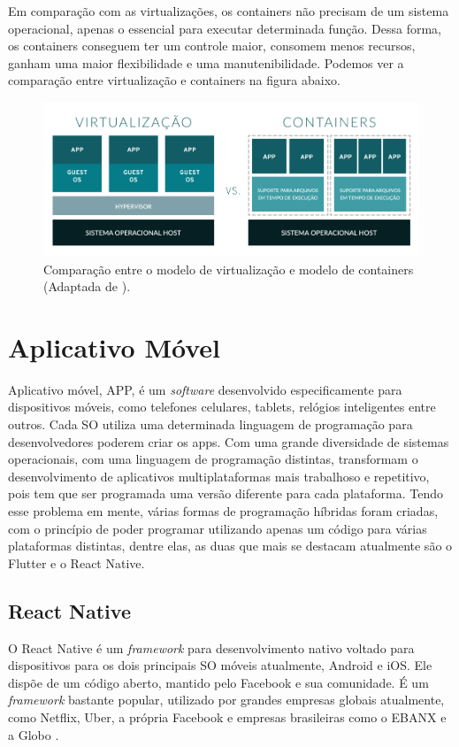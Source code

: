 Em comparação com as virtualizações, os containers não precisam de um sistema operacional, apenas o essencial para executar determinada função. Dessa forma, os containers conseguem ter um controle maior, consomem menos recursos, ganham uma maior flexibilidade e uma manutenibilidade. Podemos ver a comparação entre virtualização e containers na figura abaixo.

\begin{figure}[H]
  \centering
  \includegraphics[width=.80\textwidth]{assets/virtualization-vs-containers.png} 
  \caption{Comparação entre o modelo de virtualização e modelo de containers (Adaptada de \cite{redhat2020Containers}).}
  \label{fig:virtualization-vs-containers}
\end{figure}


\section{Aplicativo Móvel}
\label{fund:app}
Aplicativo móvel, APP, é um \textit{software} desenvolvido especificamente para dispositivos móveis, como telefones celulares, tablets, relógios inteligentes entre outros. Cada SO utiliza uma determinada linguagem de programação para desenvolvedores poderem criar os apps. Com uma grande diversidade de sistemas operacionais, com uma linguagem de programação distintas, transformam o desenvolvimento de aplicativos multiplataformas mais trabalhoso e repetitivo, pois tem que ser programada uma versão diferente para cada plataforma. Tendo esse problema em mente, várias formas de programação híbridas foram criadas, com o princípio de poder programar utilizando apenas um código para várias plataformas distintas, dentre elas, as duas que mais se destacam atualmente são o Flutter e o React Native.

\subsection{React Native}
\label{fund:react-native}
O React Native é um \textit{framework} para desenvolvimento nativo voltado para dispositivos para os dois principais SO móveis atualmente, Android e iOS. Ele dispõe de um código aberto, mantido pelo Facebook e sua comunidade. É um \textit{framework} bastante popular, utilizado por grandes empresas globais atualmente, como Netflix, Uber, a própria Facebook e empresas brasileiras como o EBANX e a Globo \cite{empresasbrreact}.

